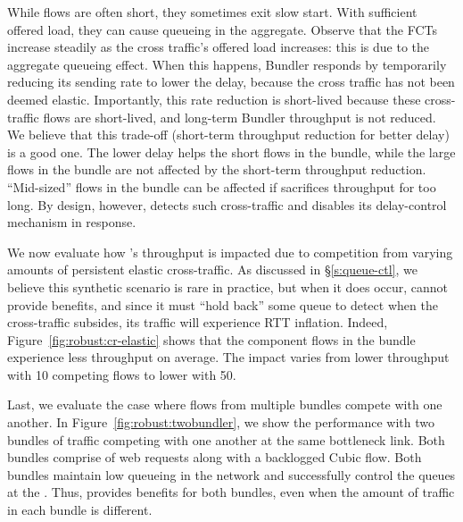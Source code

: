 While flows are often short, they sometimes exit slow start. With sufficient offered load, they can cause queueing in the aggregate. 
Observe that the \baseline FCTs increase steadily as the cross traffic's offered load increases: this is due to the aggregate queueing effect.
When this happens, Bundler responds by temporarily reducing its sending rate to lower the delay, because the cross traffic has not been deemed elastic. 
Importantly, this rate reduction is short-lived because these cross-traffic flows are short-lived, and long-term Bundler throughput is not reduced.
We believe that this trade-off (short-term throughput reduction for better delay) is a good one. 
The lower delay helps the short flows in the bundle, while the large flows in the bundle are not affected by the short-term throughput reduction. 
``Mid-sized'' flows in the bundle can be affected if \name sacrifices throughput for too long. 
By design, however, \name detects such cross-traffic and disables its delay-control mechanism in response.


We now evaluate how \name's throughput is impacted due to competition from varying amounts of persistent elastic cross-traffic. 
As discussed in \S\ref{s:queue-ctl}, we believe this synthetic scenario is rare in practice, but when it does occur, \name cannot provide benefits, and since it must ``hold back'' some queue to detect when the cross-traffic subsides, its traffic will experience RTT inflation.
Indeed, Figure~\ref{fig:robust:cr-elastic} shows that 
the component flows in the bundle experience  \bundlerElasticTputWorseness less throughput on average. 
The impact varies from \bundlerElasticTputWorsenessTen lower throughput with 10 competing flows to \bundlerElasticTputWorsenessFifty lower with 50. 


 Last, we evaluate the case where flows from multiple bundles compete with one another. 
In Figure~\ref{fig:robust:twobundler}, we show the performance with two bundles of traffic competing with one another at the same bottleneck link. 
Both bundles comprise of web requests along with a backlogged Cubic flow. 
Both bundles maintain low queueing in the network and successfully control the queues at the \inbox.
Thus, \name provides benefits for both bundles, even when the amount of traffic in each bundle is different.  

